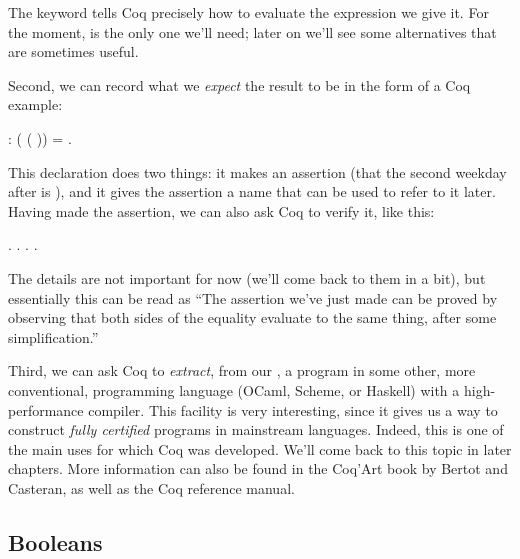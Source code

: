\documentclass[12pt]{report}
\begin{document}
 The keyword  tells Coq precisely how to
    evaluate the expression we give it.  For the moment,  is
    the only one we'll need; later on we'll see some alternatives that
    are sometimes useful. 

 Second, we can record what we \textit{expect} the result to be in
    the form of a Coq example: \begin{coqdoccode}
\coqdocemptyline
\coqdocnoindent
{} :\coqdoceol
\coqdocindent{1.00em}
( ( )) = .\coqdoceol
\coqdocemptyline
\end{coqdoccode}
This declaration does two things: it makes an
    assertion (that the second weekday after  is ),
    and it gives the assertion a name that can be used to refer to it
    later.  Having made the assertion, we can also ask Coq to verify it,
    like this: \begin{coqdoccode}
\coqdocemptyline
\coqdocnoindent
{}. . . .\coqdoceol
\coqdocemptyline
\end{coqdoccode}
The details are not important for now (we'll come back to
    them in a bit), but essentially this can be read as ``The assertion
    we've just made can be proved by observing that both sides of the
    equality evaluate to the same thing, after some simplification.'' 

 Third, we can ask Coq to \textit{extract}, from our , a
    program in some other, more conventional, programming
    language (OCaml, Scheme, or Haskell) with a high-performance
    compiler.  This facility is very interesting, since it gives us a
    way to construct \textit{fully certified} programs in mainstream
    languages.  Indeed, this is one of the main uses for which Coq was
    developed.  We'll come back to this topic in later chapters.  More
    information can also be found in the Coq'Art book by Bertot and
    Casteran, as well as the Coq reference manual. \begin{coqdoccode}
\coqdocemptyline
\end{coqdoccode}
\subsection{Booleans}
\end{document}

